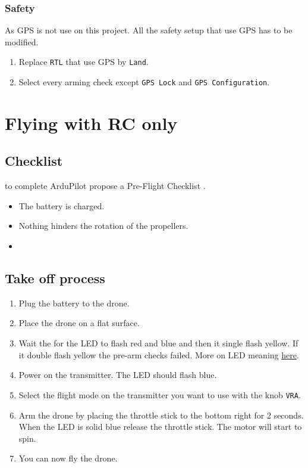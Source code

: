             \subsubsection{Safety}
                As GPS is not use on this project. All the safety setup that use GPS has to be modified.
                \begin{enumerate}
                    \item Replace \texttt{RTL} that use GPS by \texttt{Land}.
                    \item Select every arming check except \texttt{GPS Lock} and \texttt{GPS Configuration}.
                \end{enumerate}
            
    \section{Flying with RC only}
        \subsection{Checklist}
            {\color{orange} to complete} ArduPilot propose a Pre-Flight Checklist \cite{ardupilot_checklist}.
            \begin{itemize}
                \item The battery is charged.
                \item Nothing hinders the rotation of the propellers.
                \item 
            \end{itemize}
            
        \subsection{Take off process}
            \begin{enumerate}
                \item Plug the battery to the drone.
                \item Place the drone on a flat surface.
                \item Wait the for the LED to flash red and blue and then it single flash yellow. If it double flash yellow the pre-arm checks failed. More on LED meaning \href{http://ardupilot.org/copter/docs/common-leds-pixhawk.html}{here}.
                \item Power on the transmitter. The LED should flash blue.
                \item Select the flight mode on the transmitter you want to use with the knob \texttt{VRA}.
                \item Arm the drone by placing the throttle stick to the bottom right for 2 seconds. When the LED is solid blue release the throttle stick. The motor will start to spin.
                \item You can now fly the drone.
            \end{enumerate}
        
